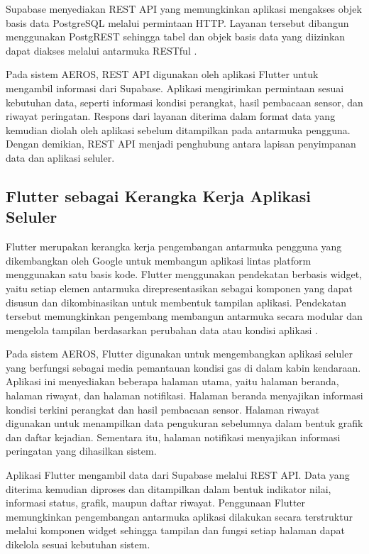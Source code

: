 Supabase menyediakan REST API yang memungkinkan aplikasi mengakses objek basis data PostgreSQL melalui permintaan HTTP. Layanan tersebut dibangun menggunakan PostgREST sehingga tabel dan objek basis data yang diizinkan dapat diakses melalui antarmuka RESTful \cite{supabase_rest}.

Pada sistem AEROS, REST API digunakan oleh aplikasi Flutter untuk mengambil informasi dari Supabase. Aplikasi mengirimkan permintaan sesuai kebutuhan data, seperti informasi kondisi perangkat, hasil pembacaan sensor, dan riwayat peringatan. Respons dari layanan diterima dalam format data yang kemudian diolah oleh aplikasi sebelum ditampilkan pada antarmuka pengguna. Dengan demikian, REST API menjadi penghubung antara lapisan penyimpanan data dan aplikasi seluler.

\subsection{Flutter sebagai Kerangka Kerja Aplikasi Seluler}
\label{subsec:Flutter}

Flutter merupakan kerangka kerja pengembangan antarmuka pengguna yang dikembangkan oleh Google untuk membangun aplikasi lintas platform menggunakan satu basis kode. Flutter menggunakan pendekatan berbasis widget, yaitu setiap elemen antarmuka direpresentasikan sebagai komponen yang dapat disusun dan dikombinasikan untuk membentuk tampilan aplikasi. Pendekatan tersebut memungkinkan pengembang membangun antarmuka secara modular dan mengelola tampilan berdasarkan perubahan data atau kondisi aplikasi \cite{flutter_architecture}.

Pada sistem AEROS, Flutter digunakan untuk mengembangkan aplikasi seluler yang berfungsi sebagai media pemantauan kondisi gas di dalam kabin kendaraan. Aplikasi ini menyediakan beberapa halaman utama, yaitu halaman beranda, halaman riwayat, dan halaman notifikasi. Halaman beranda menyajikan informasi kondisi terkini perangkat dan hasil pembacaan sensor. Halaman riwayat digunakan untuk menampilkan data pengukuran sebelumnya dalam bentuk grafik dan daftar kejadian. Sementara itu, halaman notifikasi menyajikan informasi peringatan yang dihasilkan sistem.

Aplikasi Flutter mengambil data dari Supabase melalui REST API. Data yang diterima kemudian diproses dan ditampilkan dalam bentuk indikator nilai, informasi status, grafik, maupun daftar riwayat. Penggunaan Flutter memungkinkan pengembangan antarmuka aplikasi dilakukan secara terstruktur melalui komponen widget sehingga tampilan dan fungsi setiap halaman dapat dikelola sesuai kebutuhan sistem.

